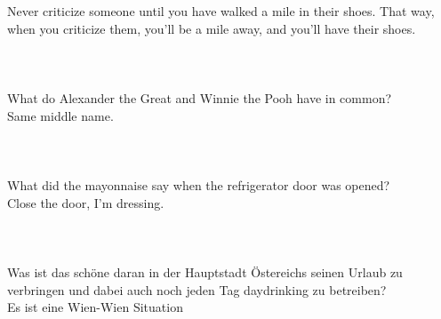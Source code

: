 
\usepackage{blindtext}



Never criticize someone until you have walked a mile in their shoes.
 That way, when you criticize them, you'll be a mile away, and you'll have their shoes.\\\\

\blindtext
\blindtext \\\\



What do Alexander the Great and Winnie the Pooh have in common?\\
 Same middle name.\\\\

\blindtext
\blindtext\\\\

What did the mayonnaise say when the refrigerator door was opened?\\
 Close the door, I'm dressing.\\\\

 \blindtext
\blindtext\\\\

Was ist das schöne daran in der Hauptstadt Östereichs seinen Urlaub zu verbringen und dabei auch noch jeden Tag daydrinking zu betreiben?\\
Es ist eine Wien-Wien Situation\\


